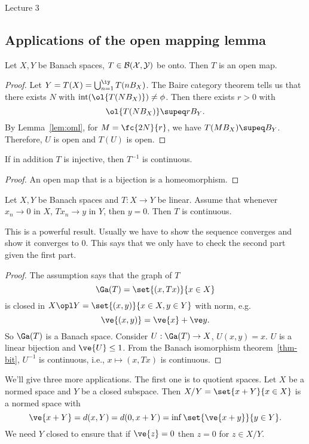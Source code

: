 {\color{blue} Lecture 3}

\subsection{Applications of the open mapping lemma}
\begin{thm}
Let $X,Y$ be Banach spaces, $T\in \cal B(X,Y)$ be onto. Then $T$ is an open map.
\end{thm}
\begin{proof}
Let $Y=T(X)=\bigcup_{n=1}^{\iy} T(nB_X)$. The Baire category theorem tells us that there exists $N$ with $\text{int}(\ol{T(NB_X)})\ne \phi$. Then there exists $r>0$ with
\[
\ol{T(NB_X)}\supeq rB_Y.
\]
By Lemma~\ref{lem:oml}, for $M=\fc{2N}{r}$, we have $T(MB_X)\supeq B_Y$. Therefore, $U$ is open and $T(U)$ is open.
\end{proof}
\begin{thm}
If in addition $T$ is injective, then $T^{-1}$ is continuous.
\end{thm}
\begin{proof}
An open map that is a bijection is a homeomorphism.
\end{proof}
\begin{thm}
Let $X,Y$ be Banach spaces and $T:X\to Y$ be linear. Assume that whenever $x_n\to 0$ in $X$, $Tx_n\to y$ in $Y$, then $y=0$. Then $T$ is continuous.
\end{thm}
This is a powerful result. Usually we have to show the sequence converges and show it converges to 0. This says that we only have to check the second part given the first part. %
\begin{proof}
The assumption says that the graph of $T$
\[
\Ga(T)=\set{(x,Tx)}{x\in X}
\]
is closed in $X\opl Y=\set{(x,y)}{x\in X,y\in Y}$ with norm, e.g.
\[
\ve{(x,y)}=\ve{x}+\ve y.
\]
So $\Ga(T)$ is a Banach space. Consider $U:\Ga(T)\to X$, $U(x,y)=x$. $U$ is a linear bijection and $\ve{U}\le 1$. From the Banach isomorphism theorem~\ref{thm-bit}, $U^{-1}$ is continuous, i.e., $x\mapsto (x,Tx)$ is continuous.
\end{proof}
We'll give three more applications. The first one is to quotient spaces. Let $X$ be a normed space and $Y$ be a closed subspace. Then $X/Y=\set{x+Y}{x\in X}$ is a normed space with 
\[
\ve{x+Y}=d(x,Y)=d(0,x+Y)=\inf\set{\ve{x+y}}{y\in Y}.
\]
We need $Y$ closed to ensure that if $\ve{z}=0$ then $z=0$ for $z\in X/Y$.
